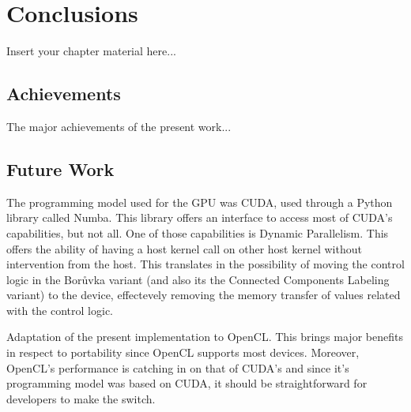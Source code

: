 
\chapter{Conclusions}
\label{chapter:conclusions}

Insert your chapter material here...


\section{Achievements}
\label{section:achievements}

The major achievements of the present work...


\section{Future Work}
\label{section:future}

The programming model used for the GPU was CUDA, used through a Python library called Numba.
This library offers an interface to access most of CUDA's capabilities, but not all.
One of those capabilities is Dynamic Parallelism.
This offers the ability of having a host kernel call on other host kernel without intervention from the host.
This translates in the possibility of moving the control logic in the Borůvka variant (and also its the Connected Components Labeling variant) to the device, effectevely removing the memory transfer of values related with the control logic.

Adaptation of the present implementation to OpenCL. This brings major benefits in respect to portability since OpenCL supports most devices. Moreover, OpenCL's performance is catching in on that of CUDA's and since it's programming model was based on CUDA, it should be straightforward for developers to make the switch.

